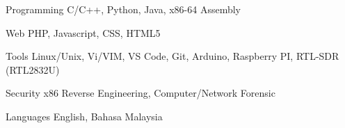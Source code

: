 

\begin{cvskills}

  \cvskill
    {Programming} %
    {C/C++, Python, Java, x86-64 Assembly} %

  \cvskill
    {Web} %
    {PHP, Javascript, CSS, HTML5} %

  \cvskill
    {Tools} %
    {Linux/Unix, Vi/VIM, VS Code, Git, Arduino, Raspberry PI, RTL-SDR (RTL2832U)} %

  \cvskill
    {Security} %
    {x86 Reverse Engineering, Computer/Network Forensic} %

  \cvskill
    {Languages} %
    {English, Bahasa Malaysia} %

\end{cvskills}
